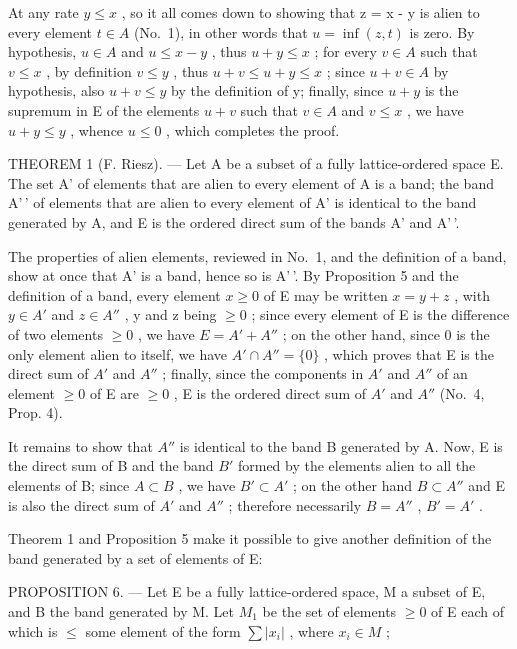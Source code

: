 At any rate \(y \leqslant x\) , so it all comes down to showing that z = x - y is alien to every element \(t \in A\) (No.~1), in other words that \(u = \inf(z, t)\) is zero. By hypothesis, \(u \in A\) and \(u \leqslant x - y\) , thus \(u + y \leqslant x\) ; for every \(v \in A\) such that \(v \leqslant x\) , by definition \(v \leqslant y\) , thus \(u + v \leqslant u + y \leqslant x\) ; since \(u + v \in A\) by hypothesis, also \(u + v \leqslant y\) by the definition of y; finally, since \(u + y\) is the supremum in E of the elements \(u + v\) such that \(v \in A\) and \(v \leqslant x\) , we have \(u + y \leqslant y\) , whence \(u \leqslant 0\) , which completes the proof.

THEOREM 1 (F. Riesz). --- Let A be a subset of a fully lattice-ordered space E. The set A' of elements that are alien to every element of A is a band; the band A'\,' of elements that are alien to every element of A' is identical to the band generated by A, and E is the ordered direct sum of the bands A' and A'\,'.

The properties of alien elements, reviewed in No.~1, and the definition of a band, show at once that A' is a band, hence so is A'\,'. By Proposition 5 and the definition of a band, every element \(x \geqslant 0\) of E may be written \(x = y + z\) , with \(y \in A'\) and \(z \in A''\) , y and z being \(\geqslant 0\) ; since every element of E is the difference of two elements \(\geqslant 0\) , we have \(E = A' + A''\) ; on the other hand, since 0 is the only element alien to itself, we have \(A' \cap A'' = \{0\}\) , which proves that E is the direct sum of \(A'\) and \(A''\) ; finally, since the components in \(A'\) and \(A''\) of an element \(\geqslant 0\) of E are \(\geqslant 0\) , E is the ordered direct sum of \(A'\) and \(A''\) (No.~4, Prop. 4).

It remains to show that \(A''\) is identical to the band B generated by A. Now, E is the direct sum of B and the band \(B'\) formed by the elements alien to all the elements of B; since \(A \subset B\) , we have \(B' \subset A'\) ; on the other hand \(B \subset A''\) and E is also the direct sum of \(A'\) and \(A''\) ; therefore necessarily \(B = A''\) , \(B' = A'\) .

Theorem 1 and Proposition 5 make it possible to give another definition of the band generated by a set of elements of E:

PROPOSITION 6. --- Let E be a fully lattice-ordered space, M a subset of E, and B the band generated by M. Let \(M_{1}\) be the set of elements \(\geqslant 0\) of E each of which is \(\leqslant\) some element of the form \(\sum |x_{i}|\) , where \(x_{i} \in M\) ;

